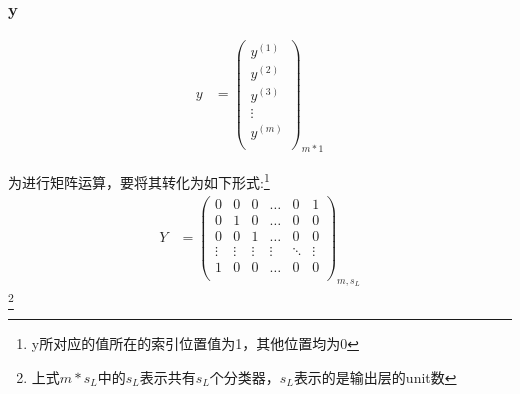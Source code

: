 \subsubsection{y}
\begin{equation} \begin{aligned}
	y & = \left(\begin{matrix}
			y^{(1)} \\ y^{(2)} \\ y^{(3)} \\ \vdots \\ y^{(m)} \\
		\end{matrix}\right)_{m*1}
\end{aligned} \end{equation}

为进行矩阵运算，要将其转化为如下形式:\footnote{y所对应的值所在的索引位置值为1，其他位置均为0}
\begin{equation}\begin{aligned}
	Y &= \left(\begin{matrix}
	        0 & 0 & 0 & \dots & 0 & 1 \\
	        0 & 1 & 0 & \dots & 0 & 0 \\
	        0 & 0 & 1 & \dots & 0 & 0 \\
	        \vdots & \vdots & \vdots & \vdots & \ddots & \vdots \\
	        1 & 0 & 0 & \dots & 0 & 0 \\
		\end{matrix}\right)_{m,s_L}
\end{aligned}\end{equation}\footnote{上式$m*s_L$中的$s_L$表示共有$s_L$个分类器，$s_L$表示的是输出层的unit数}
